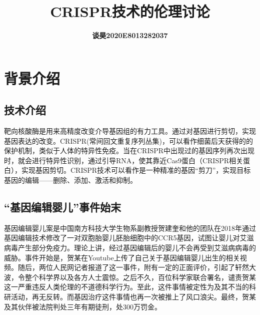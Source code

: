 \documentclass[UTF8,a4paper]{ctexart}
\title{\bfseries CRISPR技术的伦理讨论 }
\author{\bfseries 谈昊\quad2020E8013282037}
\date{}
\begin{document}
\maketitle


\section{背景介绍}
\subsection{技术介绍}
靶向核酸酶是用来高精度改变介导基因组的有力工具。通过对基因进行剪切，实现基因表达的改变。CRISPR(常间回文重复序列丛集)，可以看作细菌后天获得的的保护机制，类似于人体的特异性免疫。当在CRISPR中出现过的基因序列再次出现时，就会进行特异性识别，通过引导RNA，使其靠近Cas9蛋白（CRISPR相关蛋白），实现基因剪切。CRISPR技术可以看作是一种精准的基因“剪刀”，实现目标基因的编辑——删除、添加、激活和抑制。
\subsection{“基因编辑婴儿”事件始末}
基因编辑婴儿案是中国南方科技大学生物系副教授贺建奎和他的团队在2018年通过基因编辑技术修改了一对双胞胎婴儿胚胎细胞中的CCR5基因，试图让婴儿对艾滋病毒产生部分免疫力。理论上讲，经过基因编辑后的婴儿不会再受到艾滋病病毒的威胁。事件开始是，贺某在Youtube上传了自己关于基因编辑婴儿出生的相关视频。随后，两位人民网记者报道了这一事件，附有一定的正面评价，引起了轩然大波，令整个科学界以及各方人士震惊。之后不久，百位科学家联合署名，谴责贺某这一严重违反人类伦理的不道德科学行为。至此，这件事情被定性为及其不当的科研活动，再无反转。而基因治疗这件事情也再一次被推上了风口浪尖。最终，贺某及其伙伴被法院判处三年有期徒刑，处300万罚金。
\end{document}
